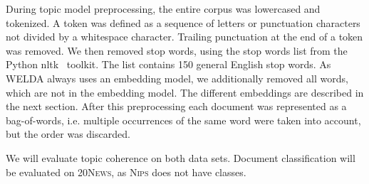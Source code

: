 \documentclass[
        a4paper,
        titlepage,
        twoside,
        parskip
        ]{scrbook}
\theoremstyle{break}
\begin{document}
During topic model preprocessing, the entire corpus was lowercased and tokenized.
A token was defined as a sequence of letters or punctuation characters not divided by a whitespace character.
Trailing punctuation at the end of a token was removed.
We then removed stop words, using the stop words list from the Python nltk~\cite{Bird2009} toolkit.
The list contains 150 general English stop words.
As WELDA always uses an embedding model, we additionally removed all words, which are not in the embedding model.
The different embeddings are described in the next section.
After this preprocessing each document was represented as a bag-of-words, i.e. multiple occurrences of the same word were taken into account, but the order was discarded.

We will evaluate topic coherence on both data sets.
Document classification will be evaluated on \textsc{20News}, as \textsc{Nips} does not have classes.
\end{document}
